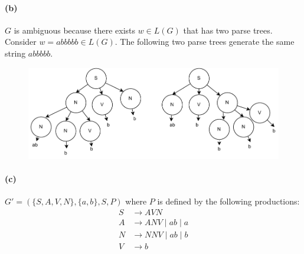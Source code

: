 \documentclass[12pt]{article}
\begin{document}
\paragraph*{(b)} \(G\) is ambiguous because there exists \(w \in L(G)\) that has two parse trees. Consider \(w = abbbbb \in L(G)\). The following two parse trees generate the same string \(abbbbb\).
\begin{figure}[htp!]
  \centering
  \includegraphics[scale = 0.8]{ex5b.pdf}
\end{figure}

\paragraph*{(c)} \(G' = (\{S, A, V, N\}, \{a, b\}, S, P)\) where \(P\) is defined by the following productions:
\begin{align*}
  S &\to AVN\\
  A &\to ANV \mid ab \mid a\\
  N &\to NNV \mid ab \mid b\\
  V &\to b
\end{align*}
\end{document}
